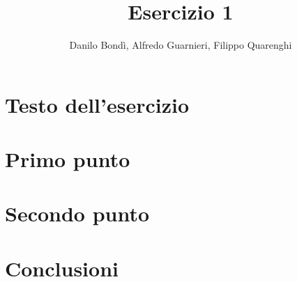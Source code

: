 \documentclass[11pt, titlepage]{article}
\title{\textbf{Esercizio 1}}
\author{Danilo Bondì, Alfredo Guarnieri, Filippo Quarenghi}
\date{}
\begin{document}
\maketitle

\section*{Testo dell'esercizio}
\textit{}

\section*{Primo punto}

\section*{Secondo punto}

\section*{Conclusioni}
\end{document}

